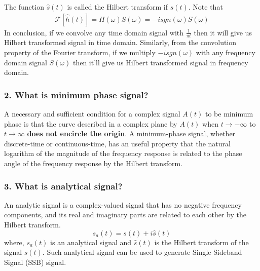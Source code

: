 The function $\hat{s}(t)$ is called the Hilbert transform if $s(t)$. Note that
\begin{equation}
\begin{split}
\mathcal{F}[\hat{h}(t)]=H(\omega)S(\omega)=-isgn(\omega)S(\omega)
\end{split}
\label{}
\end{equation}
In conclusion, if we convolve any time domain signal with $\frac{1}{\pi t}$ then it will give us Hilbert transformed signal in time domain. Similarly, from the convolution property of the Fourier transform, if we multiply $-isgn(\omega)$ with any frequency domain signal $S(\omega)$ then it'll give us Hilbert transformed signal in frequency domain.


\subsubsection{2. What is minimum phase signal?}
A necessary and sufficient condition for a complex signal $A(t)$ to be minimum phase is that the curve described in a complex plane by $A(t)$ when $t\rightarrow -\infty$ to $t\rightarrow \infty$ \textbf{does not encircle the origin}. A minimum-phase signal, whether discrete-time or continuous-time, has an useful property that the natural logarithm of the magnitude of the frequency response is related to the phase angle of the frequency response by the Hilbert transform.


\subsubsection{3. What is analytical signal?}
An analytic signal is a complex-valued signal that has no negative frequency components, and its real and imaginary parts are related to each other by the Hilbert transform.
\begin{equation}
s_a(t)=s(t)+i\hat{s}(t)
\label{Analytical signal}
\end{equation}
where, $s_a(t)$ is an analytical signal and $\hat{s}(t)$ is the Hilbert transform of the signal ${s}(t)$. Such analytical signal can be used to generate Single Sideband Signal (SSB) signal.



